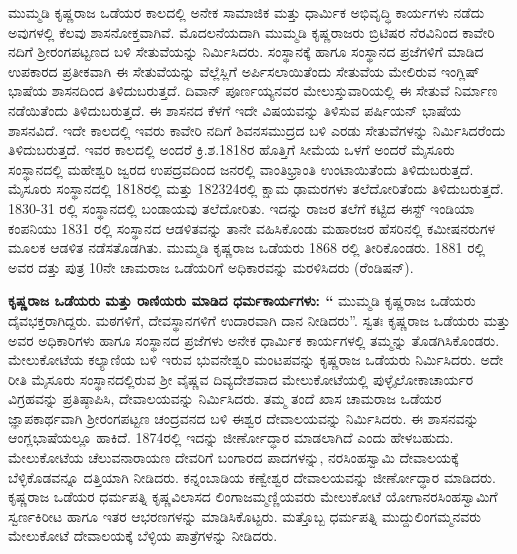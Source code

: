 ಮುಮ್ಮಡಿ ಕೃಷ್ಣರಾಜ ಒಡೆಯರ ಕಾಲದಲ್ಲಿ ಅನೇಕ ಸಾಮಾಜಿಕ ಮತ್ತು ಧಾರ್ಮಿಕ ಅಭಿವೃದ್ಧಿ ಕಾರ್ಯಗಳು ನಡೆದು ಅವುಗಳಲ್ಲಿ ಕೆಲವು ಶಾಸನೋಕ್ತವಾಗಿವೆ. ಮೊದಲನೆಯದಾಗಿ ಮುಮ್ಮಡಿ ಕೃಷ್ಣರಾಜರು ಬ್ರಿಟಿಷರ ನೆರವಿನಿಂದ ಕಾವೇರಿ ನದಿಗೆ ಶ‍್ರೀರಂಗಪಟ್ಟಣದ ಬಳಿ ಸೇತುವೆಯನ್ನು ನಿರ್ಮಿಸಿದರು. ಸಂಸ್ಥಾನಕ್ಕೆ ಹಾಗೂ ಸಂಸ್ಥಾನದ ಪ್ರಜೆಗಳಿಗೆ ಮಾಡಿದ ಉಪಕಾರದ ಪ್ರತೀಕವಾಗಿ ಈ ಸೇತುವೆಯನ್ನು ವೆಲ್ಲೆಸ್ಲಿಗೆ ಅರ್ಪಿಸಲಾಯಿತೆಂದು ಸೇತುವೆಯ ಮೇಲಿರುವ ಇಂಗ್ಲಿಷ್​ ಭಾಷೆಯ ಶಾಸನದಿಂದ ತಿಳಿದುಬರುತ್ತದೆ. ದಿವಾನ್​ ಪೂರ್ಣಯ್ಯನವರ ಮೇಲುಸ್ತುವಾರಿಯಲ್ಲಿ ಈ ಸೇತುವೆ ನಿರ್ಮಾಣ ನಡೆಯಿತೆಂದು ತಿಳಿದು\-ಬರುತ್ತದೆ. ಈ ಶಾಸನದ ಕೆಳಗೆ ಇದೇ ವಿಷಯವನ್ನು ತಿಳಿಸುವ ಪರ್ಷಿಯನ್​ ಭಾಷೆಯ ಶಾಸನವಿದೆ. ಇದೇ ಕಾಲದಲ್ಲಿ ಇವರು ಕಾವೇರಿ ನದಿಗೆ ಶಿವನಸಮುದ್ರದ ಬಳಿ ಎರಡು ಸೇತುವೆಗಳನ್ನು ನಿರ್ಮಿಸಿದರೆಂದು ತಿಳಿದುಬರುತ್ತದೆ. ಇವರ ಕಾಲದಲ್ಲಿ ಅಂದರೆ ಕ್ರಿ.ಶ.1818ರ ಹೊತ್ತಿಗೆ ಸೀಮೆಯ ಒಳಗೆ ಅಂದರೆ ಮೈಸೂರು ಸಂಸ್ಥಾನದಲ್ಲಿ ಮಹೇಶ್ವರಿ ಜ್ವರದ ಉಪದ್ರವದಿಂದ ಜನರಲ್ಲಿ ವಾಂತಿಭ್ರಾಂತಿ ಉಂಟಾಯಿತೆಂದು ತಿಳಿದುಬರುತ್ತದೆ. ಮೈಸೂರು ಸಂಸ್ಥಾನದಲ್ಲಿ 1818ರಲ್ಲಿ ಮತ್ತು 1823\enginline{-}24ರಲ್ಲಿ ಕ್ಷಾಮ ಢಾಮರಗಳು ತಲೆದೋರಿತೆಂದು ತಿಳಿದುಬರುತ್ತದೆ. 1830-31 ರಲ್ಲಿ ಸಂಸ್ಥಾನದಲ್ಲಿ ಬಂಡಾಯವು ತಲೆದೋರಿತು. ಇದನ್ನು ರಾಜರ ತಲೆಗೆ ಕಟ್ಟಿದ ಈಸ್ಟ್ ಇಂಡಿಯಾ ಕಂಪನಿಯು 1831 ರಲ್ಲಿ ಸಂಸ್ಥಾನದ ಆಡಳಿತವನ್ನು ತಾನೇ ವಹಿಸಿಕೊಂಡು ಮಹಾರಜರ ಹೆಸರಿನಲ್ಲಿ ಕಮೀಷನರುಗಳ ಮೂಲಕ ಆಡಳಿತ ನಡೆಸತೊಡಗಿತು. ಮುಮ್ಮಡಿ ಕೃಷ್ಣರಾಜ ಒಡೆಯರು 1868 ರಲ್ಲಿ ತೀರಿ\-ಕೊಂಡರು. 1881 ರಲ್ಲಿ ಅವರ ದತ್ತು ಪುತ್ರ 10ನೇ ಚಾಮರಾಜ ಒಡೆಯರಿಗೆ ಅಧಿಕಾರವನ್ನು ಮರಳಿಸಿದರು (ರೆಂಡಿಷನ್).

\textbf{ ಕೃಷ್ಣರಾಜ ಒಡೆಯರು ಮತ್ತು ರಾಣಿಯರು ಮಾಡಿದ ಧರ್ಮಕಾರ್ಯಗಳು: “} ಮುಮ್ಮಡಿ ಕೃಷ್ಣರಾಜ ಒಡೆಯರು ದೈವಭಕ್ತರಾಗಿದ್ದರು. ಮಠಗಳಿಗೆ, ದೇವಸ್ಥಾನಗಳಿಗೆ ಉದಾರವಾಗಿ ದಾನ ನೀಡಿದರು”. ಸ್ವತಃ ಕೃಷ್ಣರಾಜ ಒಡೆಯರು ಮತ್ತು ಅವರ ಅಧಿಕಾರಿಗಳು ಹಾಗೂ ಸಂಸ್ಥಾನದ ಪ್ರಜೆಗಳು ಅನೇಕ ಧಾರ್ಮಿಕ ಕಾರ್ಯಗಳಲ್ಲಿ ತಮ್ಮನ್ನು ತೊಡಗಿಸಿಕೊಂಡರು. ಮೇಲುಕೋಟೆಯ ಕಲ್ಯಾಣಿಯ ಬಳಿ ಇರುವ ಭುವನೇಶ್ವರಿ ಮಂಟಪವನ್ನು ಕೃಷ್ಣರಾಜ ಒಡೆಯರು ನಿರ್ಮಿಸಿದರು. ಅದೇ ರೀತಿ ಮೈಸೂರು ಸಂಸ್ಥಾನದಲ್ಲಿರುವ ಶ‍್ರೀ ವೈಷ್ಣವ ದಿವ್ಯದೇಶವಾದ ಮೇಲುಕೋಟೆಯಲ್ಲಿ ಪುಳ್ಳೈಲೋಕಾಚಾರ್ಯರ ವಿಗ್ರಹವನ್ನು ಪ್ರತಿಷ್ಠಾಪಿಸಿ, ದೇವಾಲಯವನ್ನು ನಿರ್ಮಿಸಿದರು. ತಮ್ಮ ತಂದೆ ಖಾಸ ಚಾಮರಾಜ ಒಡೆಯರ ಜ್ಞಾಪಕಾರ್ಥ\-ವಾಗಿ ಶ‍್ರೀರಂಗಪಟ್ಟಣ ಚಂದ್ರವನದ ಬಳಿ ಈಶ್ವರ ದೇವಾಲಯವನ್ನು ನಿರ್ಮಿಸಿದರು. ಈ ಶಾಸನವನ್ನು ಆಂಗ್ಲಭಾಷೆ\-ಯಲ್ಲೂ ಹಾಕಿದೆ. 1874ರಲ್ಲಿ ಇದನ್ನು ಜೀರ್ಣೋದ್ಧಾರ ಮಾಡಲಾಗಿದೆ ಎಂದು ಹೇಳಬಹುದು. ಮೇಲುಕೋಟೆಯ ಚೆಲುವನಾರಾಯಣ ದೇವರಿಗೆ ಬಂಗಾರದ ಪಾದಗಳನ್ನು, ನರಸಿಂಹಸ್ವಾಮಿ ದೇವಾಲಯಕ್ಕೆ ಬೆಳ್ಳಿಕೊಡವನ್ನೂ ದತ್ತಿಯಾಗಿ ನೀಡಿದರು. ಕನ್ನಂಬಾಡಿಯ ಕಣ್ವೇಶ್ವರ ದೇವಾಲಯವನ್ನು ಜೀರ್ಣೋದ್ಧಾರ ಮಾಡಿದರು. ಕೃಷ್ಣರಾಜ ಒಡೆಯರ ಧರ್ಮಪತ್ನಿ ಕೃಷ್ಣವಿಲಾಸದ ಲಿಂಗಾಜಮ್ಮಣ್ಣಿಯವರು ಮೇಲುಕೋಟೆ ಯೋಗಾನರಸಿಂಹಸ್ವಾಮಿಗೆ ಸ್ವರ್ಣಕಿರೀಟ ಹಾಗೂ ಇತರ ಆಭರಣಗಳನ್ನು ಮಾಡಿಸಿಕೊಟ್ಟರು. ಮತ್ತೊಬ್ಬ ಧರ್ಮಪತ್ನಿ ಮುದ್ದುಲಿಂಗಮ್ಮನವರು ಮೇಲುಕೋಟೆ ದೇವಾಲಯಕ್ಕೆ ಬೆಳ್ಳಿಯ ಪಾತ್ರೆಗಳನ್ನು ನೀಡಿದರು.

